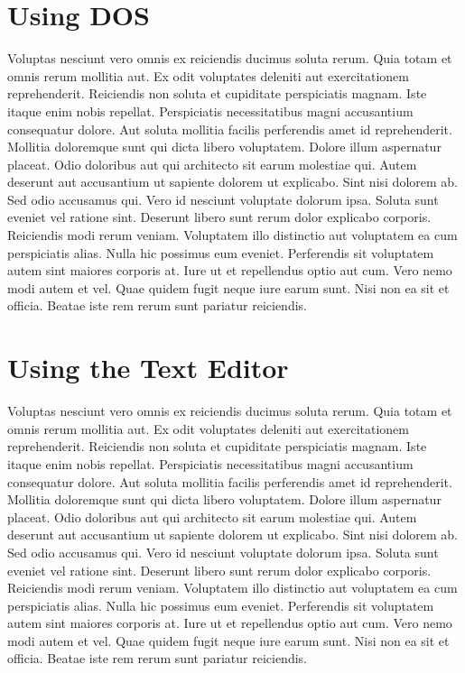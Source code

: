 \documentclass[
	11pt, %
	fleqn, %
	letterpaper, %
]{CommodoreBlueBook}
\begin{document}
\chapter*{Using DOS}

Voluptas nesciunt vero omnis ex reiciendis ducimus soluta rerum. Quia totam et
omnis rerum mollitia aut. Ex odit voluptates deleniti aut exercitationem
reprehenderit. Reiciendis non soluta et cupiditate perspiciatis magnam. Iste
itaque enim nobis repellat. Perspiciatis necessitatibus magni accusantium
consequatur dolore. Aut soluta mollitia facilis perferendis amet id
reprehenderit. Mollitia doloremque sunt qui dicta libero voluptatem. Dolore
illum aspernatur placeat. Odio doloribus aut qui architecto sit earum molestiae
qui. Autem deserunt aut accusantium ut sapiente dolorem ut explicabo. Sint nisi
dolorem ab. Sed odio accusamus qui. Vero id nesciunt voluptate dolorum ipsa.
Soluta sunt eveniet vel ratione sint. Deserunt libero sunt rerum dolor
explicabo corporis. Reiciendis modi rerum veniam. Voluptatem illo distinctio
aut voluptatem ea cum perspiciatis alias. Nulla hic possimus eum eveniet.
Perferendis sit voluptatem autem sint maiores corporis at. Iure ut et
repellendus optio aut cum. Vero nemo modi autem et vel. Quae quidem fugit neque
iure earum sunt. Nisi non ea sit et officia. Beatae iste rem rerum sunt
pariatur reiciendis.

\chapter*{Using the Text Editor}

Voluptas nesciunt vero omnis ex reiciendis ducimus soluta rerum. Quia totam et
omnis rerum mollitia aut. Ex odit voluptates deleniti aut exercitationem
reprehenderit. Reiciendis non soluta et cupiditate perspiciatis magnam. Iste
itaque enim nobis repellat. Perspiciatis necessitatibus magni accusantium
consequatur dolore. Aut soluta mollitia facilis perferendis amet id
reprehenderit. Mollitia doloremque sunt qui dicta libero voluptatem. Dolore
illum aspernatur placeat. Odio doloribus aut qui architecto sit earum molestiae
qui. Autem deserunt aut accusantium ut sapiente dolorem ut explicabo. Sint nisi
dolorem ab. Sed odio accusamus qui. Vero id nesciunt voluptate dolorum ipsa.
Soluta sunt eveniet vel ratione sint. Deserunt libero sunt rerum dolor
explicabo corporis. Reiciendis modi rerum veniam. Voluptatem illo distinctio
aut voluptatem ea cum perspiciatis alias. Nulla hic possimus eum eveniet.
Perferendis sit voluptatem autem sint maiores corporis at. Iure ut et
repellendus optio aut cum. Vero nemo modi autem et vel. Quae quidem fugit neque
iure earum sunt. Nisi non ea sit et officia. Beatae iste rem rerum sunt
pariatur reiciendis.
\end{document}
